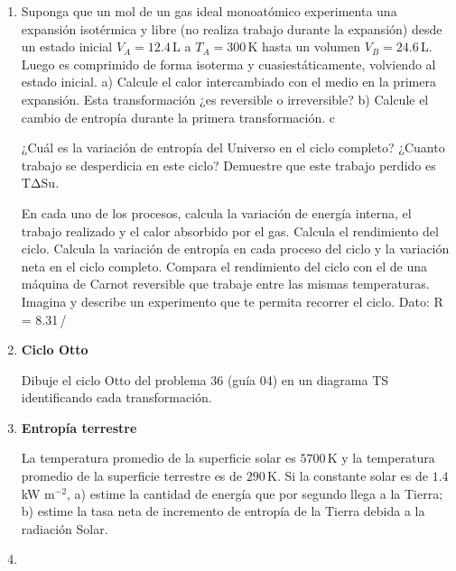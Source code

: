 \documentclass[a4paper,12pt]{article}
\begin{document}
\begin{enumerate}
	\item {\bf{}}

		Suponga que un mol de un gas ideal monoatómico experimenta una expansión isotérmica y libre (no realiza trabajo durante la expansión) desde un estado inicial $V_A=12.4$\,L a $T_A=300$\,K hasta un volumen $V_B=24.6$\,L. Luego es comprimido de forma isoterma y cuasiestáticamente, volviendo al estado inicial. a) Calcule el calor intercambiado con el medio en la primera expansión. Esta transformación ¿es reversible o irreversible? b) Calcule el cambio de entropía durante la primera transformación. c

¿Cuál es la variación de entropía del Universo en el ciclo completo?
¿Cuanto trabajo se desperdicia en este ciclo?
Demuestre que este trabajo perdido es TΔSu.


En cada uno de los procesos, calcula la variación de energía interna, el trabajo realizado y el calor absorbido por el gas. Calcula el rendimiento del ciclo.
Calcula la variación de entropía en cada proceso del ciclo y la variación neta en el ciclo completo.
Compara el rendimiento del ciclo con el de una máquina de Carnot reversible que trabaje entre las mismas temperaturas.
Imagina y describe un experimento que te permita recorrer el ciclo.
Dato: R = 8.31\,/\cdot{}

	\item {\bf{Ciclo Otto}}

		Dibuje el ciclo Otto del problema 36 (guía 04) en un diagrama TS
		identificando cada transformación. 
	
	\item {\bf{Entropía terrestre}}

		La temperatura promedio de la superficie solar es $5700$\,K y la
		temperatura promedio de la superficie terrestre es de $290$\,K. Si la
		constante solar es de $1.4$\,kW m$^{-2}$, a) estime la cantidad de
		energía que por segundo llega a la Tierra; b) estime la tasa neta de
		incremento de entropía de la Tierra debida a la radiación Solar.

	\item {\bf{}}
\end{enumerate}
\end{document}

